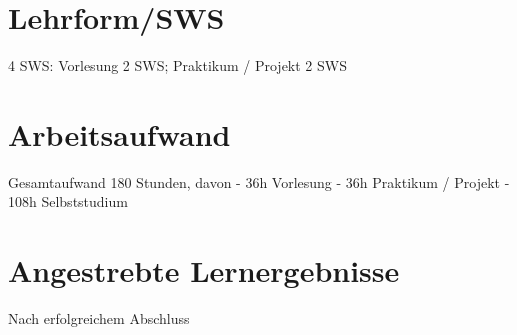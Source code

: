 \section*{Lehrform/SWS
\label{/mi-2017/modulbeschreibungen-master/MA_VC_Modul_BildbasierteComputergrafik}}\label{lehrformsws-pathlabelmi-2017modulbeschreibungen-mastermaux5fvcux5fmodulux5fbildbasiertecomputergrafik}

4 SWS: Vorlesung 2 SWS; Praktikum / Projekt 2 SWS

\section*{Arbeitsaufwand
\label{/mi-2017/modulbeschreibungen-master/MA_VC_Modul_BildbasierteComputergrafik}}\label{arbeitsaufwand-pathlabelmi-2017modulbeschreibungen-mastermaux5fvcux5fmodulux5fbildbasiertecomputergrafik}

Gesamtaufwand 180 Stunden, davon - 36h Vorlesung - 36h Praktikum /
Projekt - 108h Selbststudium

\section*{Angestrebte
Lernergebnisse\label{/mi-2017/modulbeschreibungen-master/MA_VC_Modul_BildbasierteComputergrafik}}\label{angestrebte-lernergebnissepathlabelmi-2017modulbeschreibungen-mastermaux5fvcux5fmodulux5fbildbasiertecomputergrafik}

Nach erfolgreichem Abschluss

